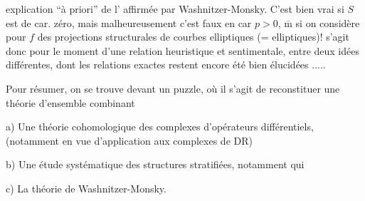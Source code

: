 explication ``à priori'' de l'  affirmée par Washnitzer-Monsky.
C'est bien vrai si $S$ est de car. zéro, mais malheureusement c'est faux en car $p>0$, $\overline{\mathrm m}$ si on considère pour $f$ des projections structurales de  courbes elliptiques (=  elliptiques)!
 s'agit donc pour le moment d'une relation heuristique et sentimentale, entre deux idées différentes, dont les relations exactes restent   encore  été bien élucidées .....


Pour résumer, on se trouve  devant un puzzle, où il s'agit de reconstituer une théorie d'ensemble   combinant

a) Une théorie cohomologique des complexes d'opérateurs différentiels,  (notamment en vue d'application aux complexes de DR)

b) Une étude systématique des structures stratifiées, notamment   qui 

c) La théorie de Washnitzer-Monsky.

